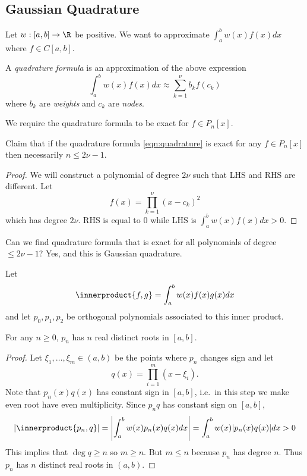 \documentclass[a4paper]{article}
\newcommand*{\inner}{\innerproduct}
\begin{document}
\subsection{Gaussian Quadrature}

\begin{question}
  Let \(w: [a, b] \to \R\) be positive. We want to approximate \(\int_a^b w(x)f(x) dx\) where \(f \in C[a, b]\).
\end{question}
A \emph{quadrature formula} is an approximation of the above expression
\begin{equation}
  \label{eqn:quadrature}
  \int_a^b w(x)f(x) dx \approx \sum_{k = 1}^\nu b_kf(c_k)
  \tag{\(\ast\)}
\end{equation}
where \(b_k\) are \emph{weights} and \(c_k\) are \emph{nodes}.

We require the quadrature formula to be exact for \(f \in P_n[x]\).

Claim that if the quadrature formula \eqref{eqn:quadrature} is exact for any \(f \in P_n[x]\) then necessarily \(n \leq 2\nu - 1\).

\begin{proof}
  We will construct a polynomial of degree \(2\nu\) such that LHS and RHS are different. Let
  \[
    f(x) = \prod_{k = 1}^\nu (x - c_k)^2
  \]
  which has degree \(2\nu\). RHS is equal to \(0\) while LHS is \(\int_a^b w(x)f(x)dx > 0\).
\end{proof}

Can we find quadrature formula that is exact for all polynomials of degree \(\leq 2\nu - 1\)? Yes, and this is Gaussian quadrature.

Let
\[
  \inner{f, g} = \int_a^b w(x)f(x)g(x) dx
\]
and let \(p_0, p_1, p_2\) be orthogonal polynomials associated to this inner product.

\begin{theorem}
  For any \(n \geq 0\), \(p_n\) has \(n\) real distinct roots in \([a, b]\).
\end{theorem}

\begin{proof}
  Let \(\xi_1, \dots, \xi_m \in (a, b)\) be the points where \(p_n\) changes sign and let
  \[
    q(x) = \prod_{i = 1}^m (x - \xi_i).
  \]
  Note that \(p_n(x)q(x)\) has constant sign in \([a, b]\), i.e.\ in this step we make even root have even multiplicity. Since \(p_nq\) has constant sign on \([a, b]\),
  \[
    |\inner{p_n, q}| = \left| \int_a^b w(x)p_n(x)q(x) dx \right| = \int_a^b w(x) |p_n(x)q(x)| dx > 0
  \]
  This implies that \(\deg q \geq n\) so \(m \geq n\). But \(m \leq n\) because \(p_n\) has degree \(n\). Thus \(p_n\) has \(n\) distinct real roots in \((a, b)\).
\end{proof}
\end{document}
